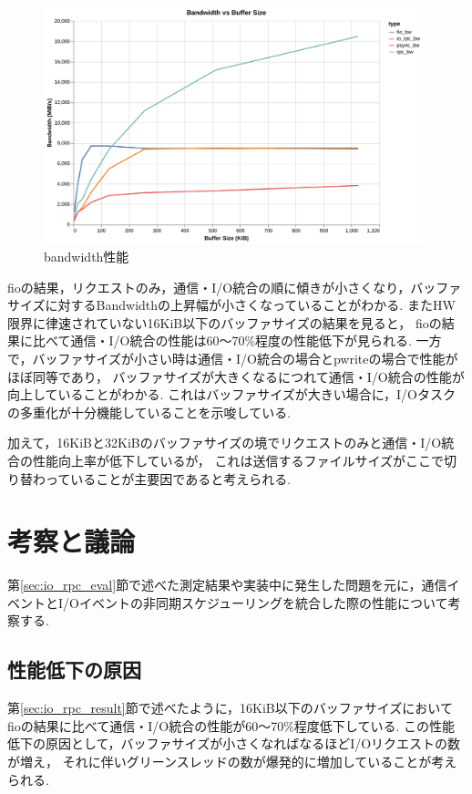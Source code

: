 \documentclass[a4paper,11pt]{jreport}
\begin{document}
\begin{figure}[tb]
	\centering
	\includegraphics[width=11cm, bb=0 0 700 450]{figures/bw_linear_plot.pdf}
	\caption{bandwidth性能}
	\label{fig:io_rpc_bw}
\end{figure}

fioの結果，リクエストのみ，通信・I/O統合の順に傾きが小さくなり，バッファサイズに対するBandwidthの上昇幅が小さくなっていることがわかる.
またHW限界に律速されていない16KiB以下のバッファサイズの結果を見ると，
fioの結果に比べて通信・I/O統合の性能は60〜70\%程度の性能低下が見られる.
一方で，バッファサイズが小さい時は通信・I/O統合の場合とpwriteの場合で性能がほぼ同等であり，
バッファサイズが大きくなるにつれて通信・I/O統合の性能が向上していることがわかる.
これはバッファサイズが大きい場合に，I/Oタスクの多重化が十分機能していることを示唆している.

加えて，16KiBと32KiBのバッファサイズの境でリクエストのみと通信・I/O統合の性能向上率が低下しているが，
これは送信するファイルサイズがここで切り替わっていることが主要因であると考えられる.

\section{考察と議論}\label{sec:discussion}
第\ref{sec:io_rpc_eval}節で述べた測定結果や実装中に発生した問題を元に，通信イベントとI/Oイベントの非同期スケジューリングを統合した際の性能について考察する.

\subsection{性能低下の原因}\label{sec:io_rpc_cause}
第\ref{sec:io_rpc_result}節で述べたように，16KiB以下のバッファサイズにおいて
fioの結果に比べて通信・I/O統合の性能が60〜70\%程度低下している.
この性能低下の原因として，バッファサイズが小さくなればなるほどI/Oリクエストの数が増え，
それに伴いグリーンスレッドの数が爆発的に増加していることが考えられる.
\end{document}
